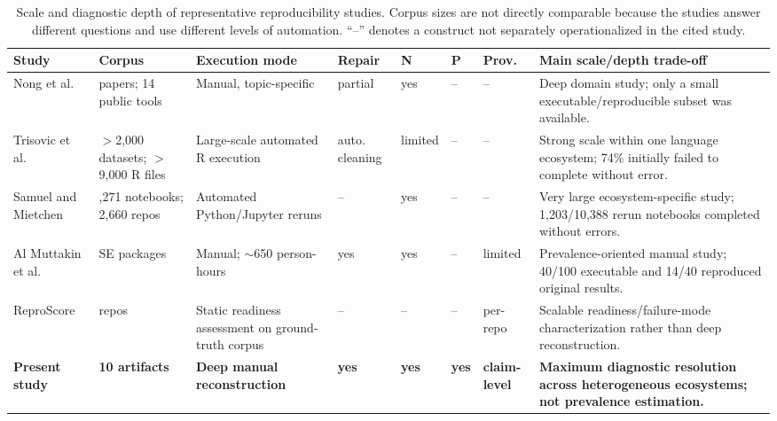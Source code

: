 \documentclass[a4paper,fleqn]{cas-dc}
\begin{document}
\begin{table}[t]
\centering
\caption{Scale and diagnostic depth of representative reproducibility studies. Corpus sizes are not directly comparable because the studies answer different questions and use different levels of automation. ``--'' denotes a construct not separately operationalized in the cited study.}
\label{tab:3}
\footnotesize
\setlength{\tabcolsep}{1.6pt}
\begin{tabularx}{\textwidth}{@{}>{\raggedright\arraybackslash}p{1.90cm}>{\raggedright\arraybackslash}p{1.10cm}>{\raggedright\arraybackslash}p{1.82cm}>{\centering\arraybackslash}p{0.72cm}>{\centering\arraybackslash}p{0.72cm}>{\centering\arraybackslash}p{0.45cm}>{\centering\arraybackslash}p{0.82cm}>{\raggedright\arraybackslash}X@{}}
\toprule
Study & Corpus & Execution mode & Repair & N & P & Prov. & Main scale/depth trade-off \\
\midrule
Nong et al. \citep{nong2023openscience} & 55 papers; 14 public tools & Manual, topic-specific & partial & yes & -- & -- & Deep domain study; only a small executable/reproducible subset was available. \\
Trisovic et al. \citep{trisovic2022largescale} & $>$2,000 datasets; $>$9,000 R files & Large-scale automated R execution & auto. cleaning & limited & -- & -- & Strong scale within one language ecosystem; 74\% initially failed to complete without error. \\
Samuel and Mietchen \citep{samuel2024jupyter} & 27,271 notebooks; 2,660 repos & Automated Python/\allowbreak Jupyter reruns & -- & yes & -- & -- & Very large ecosystem-specific study; 1,203/10,388 rerun notebooks completed without errors. \\
Al Muttakin et al. \citep{muttakin2026openscience} & 100 SE packages & Manual; $\sim$650 person-hours & yes & yes & -- & limited & Prevalence-oriented manual study; 40/100 executable and 14/40 reproduced original results. \\
ReproScore \citep{samuel2026reproscore} & 423 repos & Static readiness assessment on ground-truth corpus & -- & -- & -- & per-repo & Scalable readiness/failure-mode characterization rather than deep reconstruction. \\
\textbf{Present study} & \textbf{10 artifacts} & \textbf{Deep manual reconstruction} & \textbf{yes} & \textbf{yes} & \textbf{yes} & \textbf{claim-level} & \textbf{Maximum diagnostic resolution across heterogeneous ecosystems; not prevalence estimation.} \\
\bottomrule
\end{tabularx}
\end{table}
\end{document}
